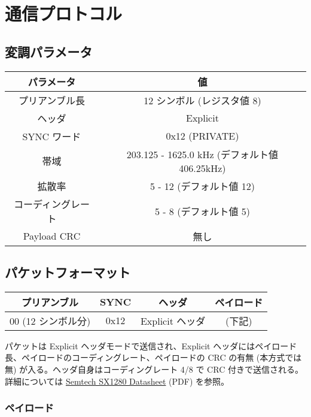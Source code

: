 \documentclass[a4j,oneside]{ujbook}
\begin{document}
\section*{通信プロトコル}

\subsection*{変調パラメータ}
\begin{center}
 \begin{tabular}{|c|c|}
  \hline
  {パラメータ} & {値} \\
  \hline
  {プリアンブル長} & {12 シンボル (レジスタ値 8)} \\
  {ヘッダ} & {Explicit} \\
  {SYNC ワード} & {0x12 (PRIVATE)} \\
  {帯域} & {203.125 - 1625.0 kHz (デフォルト値 406.25kHz)} \\
  {拡散率} & {5 - 12 (デフォルト値 12)} \\
  {コーディングレート} & {5 - 8 (デフォルト値 5)} \\
  {Payload CRC} & {無し} \\
  \hline
 \end{tabular}
\end{center}

\subsection*{パケットフォーマット}

\begin{center}
 \begin{tabular}{|c|c|c|c|}
  \hline
  {プリアンブル} & {SYNC} & {ヘッダ} & {ペイロード} \\
  \hline
  {00 (12 シンボル分)} & {0x12} & {Explicit ヘッダ} & {(下記)} \\
  \hline
 \end{tabular}
\end{center}

パケットは Explicit ヘッダモードで送信され、Explicit ヘッダにはペイロード長、ペイロードのコーディングレート、ペイロードの CRC の有無 (本方式では無) が入る。ヘッダ自身はコーディングレート 4/8 で CRC 付きで送信される。詳細については \href{https://semtech.my.salesforce.com/sfc/p/E0000000JelG/a/2R000000HoCW/8EVYKPLcthcKCB_cKzApAc6Xf6tAHtn9.UKcOh7SNmg}{Semtech SX1280 Datasheet} (PDF) を参照。

\subsubsection*{ペイロード}
\end{document}
